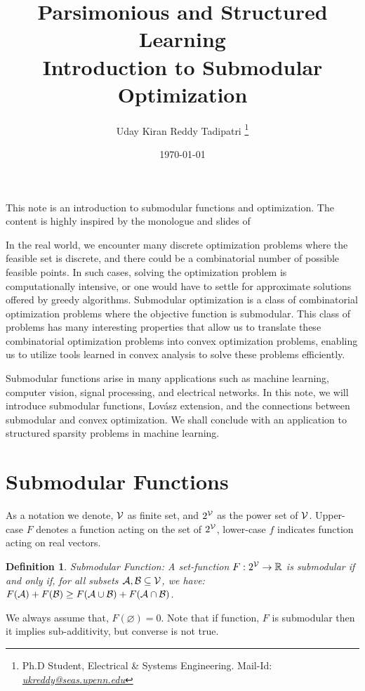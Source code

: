 \documentclass[11pt]{article}
\newtheorem{definition}{Definition}{\bf}{\it}
\begin{document}
\title{Parsimonious and Structured Learning\\
Introduction to Submodular Optimization}

\author{Uday Kiran Reddy Tadipatri
\thanks{Ph.D Student, Electrical \& Systems Engineering. 
Mail-Id: \href{mailto:ukreddy@seas.upenn.edu}{\textit{ukreddy@seas.upenn.edu}}}}

\date{\today}
\maketitle
This note is an introduction to submodular functions and optimization. The content is highly
inspired by the monologue and slides of

In the real world, we encounter many discrete optimization problems where the feasible set is discrete,
and there could be a combinatorial number of possible feasible points. In such cases, solving the optimization
problem is computationally intensive, or one would have to settle for approximate solutions offered by 
greedy algorithms. Submodular optimization is a class of combinatorial optimization problems where the objective 
function is submodular. This class of problems has many interesting properties that allow us to translate these 
combinatorial optimization problems into convex optimization problems, enabling us to utilize tools learned in 
convex analysis to solve these problems efficiently.


Submodular functions arise in many applications such as machine learning, computer vision, 
signal processing, and electrical networks. In this note, we will introduce submodular functions, 
Lovász extension, and the connections between submodular and convex optimization. We shall conclude with 
an application to structured sparsity problems in machine learning.

\section{Submodular Functions}
As a notation we denote, ${\cal V}$ as finite set, and $2^{{\cal V}}$ as the power set of ${\cal V}$. Upper-case $F$ denotes
a function acting on the set of $2^{{\cal V}}$, lower-case $f$ indicates function acting on real vectors. 
\begin{definition}{Submodular Function:}
A set-function $F: 2^{{\cal V}} \to {\mathbb R}$ is submodular if and only if,
for all subsets ${\cal A}, {\cal B} \subseteq {\cal V}$, we have: $F({\cal A}) + F({\cal B}) \geq F({\cal A} \cup {\cal B}) + F({\cal A} \cap {\cal B})$.
\end{definition}
We always assume that, $F(\varnothing) = 0$. Note that if function, $F$ is submodular
then it implies sub-additivity, but converse is not true.
\end{document}
